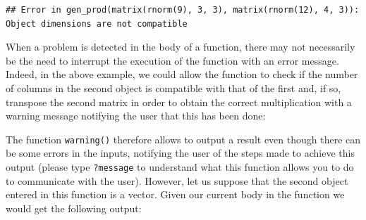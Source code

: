 \documentclass[12pt,]{krantz}
\newenvironment{Shaded}{\begin{snugshade}}{\end{snugshade}}
\newcommand{\KeywordTok}[1]{\textcolor[rgb]{0.27,0.27,0.27}{\textbf{#1}}}
\newcommand{\DataTypeTok}[1]{\textcolor[rgb]{0.27,0.27,0.27}{#1}}
\newcommand{\DecValTok}[1]{\textcolor[rgb]{0.06,0.06,0.06}{#1}}
\newcommand{\StringTok}[1]{\textcolor[rgb]{0.5,0.5,0.5}{#1}}
\newcommand{\ControlFlowTok}[1]{\textcolor[rgb]{0.27,0.27,0.27}{\textbf{#1}}}
\newcommand{\OperatorTok}[1]{\textcolor[rgb]{0.43,0.43,0.43}{\textbf{#1}}}
\newcommand{\NormalTok}[1]{#1}
\begin{document}
\begin{verbatim}
## Error in gen_prod(matrix(rnorm(9), 3, 3), matrix(rnorm(12), 4, 3)): Object dimensions are not compatible
\end{verbatim}

When a problem is detected in the body of a function, there may not
necessarily be the need to interrupt the execution of the function with
an error message. Indeed, in the above example, we could allow the
function to check if the number of columns in the second object is
compatible with that of the first and, if so, transpose the second
matrix in order to obtain the correct multiplication with a warning
message notifying the user that this has been done:

\begin{Shaded}
\end{Shaded}

The function \texttt{warning()} therefore allows to output a result even
though there can be some errors in the inputs, notifying the user of the
steps made to achieve this output (please type \texttt{?message} to
understand what this function allows you to do to communicate with the
user). However, let us suppose that the second object entered in this
function is a vector. Given our current body in the function we would
get the following output:
\end{document}
